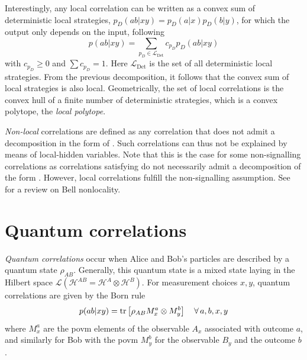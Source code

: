 Interestingly, any local correlation can be written as a convex sum of deterministic local strategies, $p_D(ab|xy)=p_D(a|x)p_D(b|y)$, for which the output only depends on the input, following
\begin{equation}
	p(ab|xy) = \sum_{p_D \in \mathcal{L}_\text{Det}} c_{p_D} p_D(ab|xy)
	\label{eq:polytope}
\end{equation}
with $c_{p_D}\geq 0$ and $\sum c_{p_D} = 1$. 
Here $\mathcal{L}_\text{Det}$ is the set of all deterministic local strategies.
From the previous decomposition, it follows that the convex sum of local strategies is also local. 
Geometrically, the set of local correlations is the convex hull of a finite number of deterministic strategies, which is a convex polytope, the \textit{local polytope}.

\medbreak

\textit{Non-local} correlations are defined as any correlation that does not admit a decomposition in the form of .
Such correlations can thus not be explained by means of local-hidden variables. 
Note that this is the case for some non-signalling correlations as correlations satisfying  do not necessarily admit a decomposition of the form .
However, local correlations fulfill the non-signalling assumption. 
See \cite{Brunner14,Scarani2019} for a review on Bell nonlocality.

\section{Quantum correlations}

\textit{Quantum correlations} occur when Alice and Bob's particles are described by a quantum state $\rho_{AB}$.
Generally, this quantum state is a mixed state laying in the Hilbert space $\mathcal{L}(\mathscr{H}^{AB} = \mathscr{H}^{A} \otimes \mathscr{H}^B)$.
For measurement choices $x,y$, quantum correlations are given by the Born rule
\begin{equation}
	p(ab|xy) = \trr{\rho_{AB} M^a_x \otimes M^b_y} \quad \forall\,a,b,x,y
	\label{eq:Born}
\end{equation}
where $M^a_x$ are the \acrfull{povm} elements of the observable $A_x$ associated with outcome $a$, and similarly for Bob with the \acrshort{povm} $M^b_y$ for the observable $B_y$ and the outcome $b$.

\medbreak

